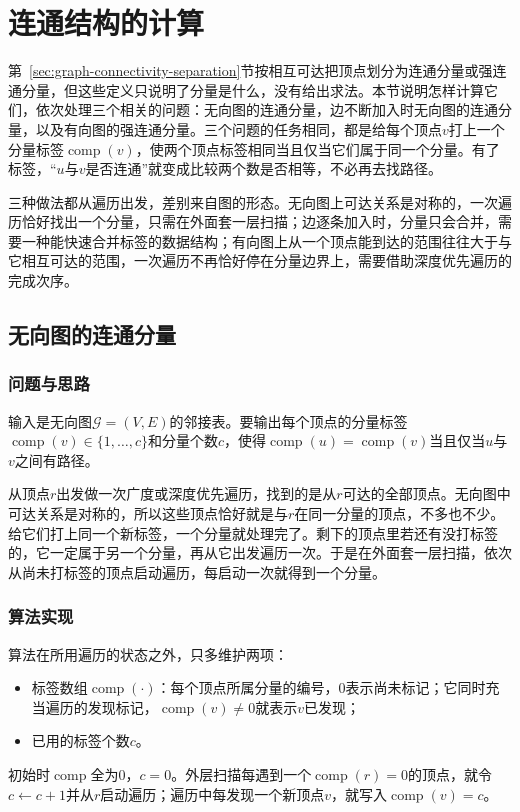 \section{连通结构的计算}
\label{sec:graph-connectivity-computation}

第~\ref{sec:graph-connectivity-separation}节按相互可达把顶点划分为连通分量或强连通分量，但这些定义只说明了分量是什么，没有给出求法。本节说明怎样计算它们，依次处理三个相关的问题：无向图的连通分量，边不断加入时无向图的连通分量，以及有向图的强连通分量。三个问题的任务相同，都是给每个顶点$v$打上一个分量标签$\operatorname{comp}(v)$，使两个顶点标签相同当且仅当它们属于同一个分量。有了标签，“$u$与$v$是否连通”就变成比较两个数是否相等，不必再去找路径。

三种做法都从遍历出发，差别来自图的形态。无向图上可达关系是对称的，一次遍历恰好找出一个分量，只需在外面套一层扫描；边逐条加入时，分量只会合并，需要一种能快速合并标签的数据结构；有向图上从一个顶点能到达的范围往往大于与它相互可达的范围，一次遍历不再恰好停在分量边界上，需要借助深度优先遍历的完成次序。

\subsection{无向图的连通分量}
\label{sec:graph-trav-components-forest}

\subsubsection{问题与思路}

输入是无向图$\mathcal G=(V,E)$的邻接表。要输出每个顶点的分量标签$\operatorname{comp}(v)\in\{1,\ldots,c\}$和分量个数$c$，使得$\operatorname{comp}(u)=\operatorname{comp}(v)$当且仅当$u$与$v$之间有路径。

从顶点$r$出发做一次广度或深度优先遍历，找到的是从$r$可达的全部顶点。无向图中可达关系是对称的，所以这些顶点恰好就是与$r$在同一分量的顶点，不多也不少。给它们打上同一个新标签，一个分量就处理完了。剩下的顶点里若还有没打标签的，它一定属于另一个分量，再从它出发遍历一次。于是在外面套一层扫描，依次从尚未打标签的顶点启动遍历，每启动一次就得到一个分量。

\subsubsection{算法实现}

算法在所用遍历的状态之外，只多维护两项：
\begin{itemize}
  \item 标签数组$\operatorname{comp}(\cdot)$：每个顶点所属分量的编号，$0$表示尚未标记；它同时充当遍历的发现标记，$\operatorname{comp}(v)\neq0$就表示$v$已发现；
  \item 已用的标签个数$c$。
\end{itemize}
初始时$\operatorname{comp}$全为$0$，$c=0$。外层扫描每遇到一个$\operatorname{comp}(r)=0$的顶点，就令$c\gets c+1$并从$r$启动遍历；遍历中每发现一个新顶点$v$，就写入$\operatorname{comp}(v)=c$。

